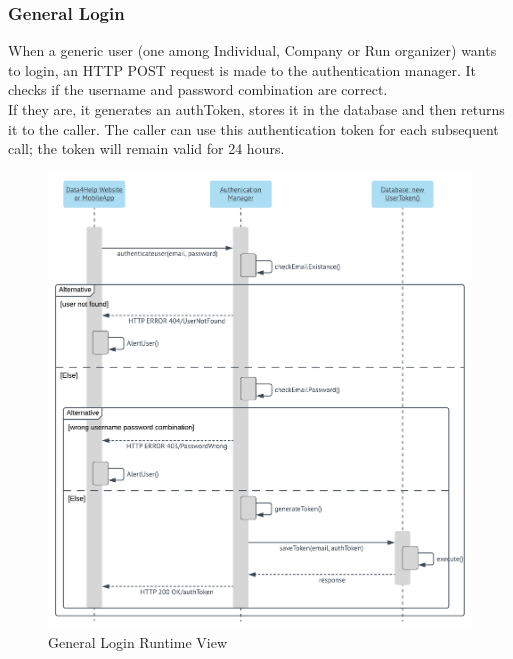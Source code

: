 \subsubsection{General Login}
When a generic user (one among Individual, Company or Run organizer) wants to login, an HTTP POST request is made to the authentication manager. It checks if the username and password combination are correct.\\
If they are, it generates an authToken, stores it in the database and then returns it to the caller.
The caller can use this authentication token for each subsequent call; the token will remain valid for 24 hours.
\begin{figure}[H]
	\includegraphics[width=\textwidth,height=\textheight,keepaspectratio]{assets/flowCharts/UserLogsIn.pdf}
	\caption{General Login Runtime View}
	\label{fig:UserLogsIn}
\end{figure}



